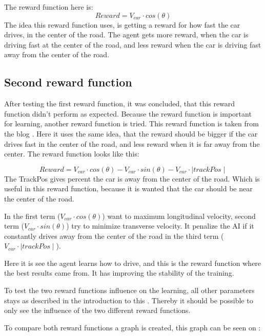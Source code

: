 The reward function here is:
\begin{equation}
Reward = V_{car} \cdot cos(\theta) 
\end{equation}
The idea this reward function uses, is getting a reward for how fast the car drives, in the center of the road. The agent gets more reward, when the car is driving fast at the center of the road, and less reward when the car is driving fast away from the center of the road. 

\subsection*{Second reward function}
After testing the first reward function, it was concluded, that this reward function didn't perform as expected. Because the reward function is important for learning, another reward function is tried. This reward function is taken from the blog \cite{DDPG_Torcs}. Here it uses the same idea, that the reward should be bigger if the car drives fast in the center of the road, and less reward when it is far away from the center. The reward function looks like this:

\begin{equation}
\label{eq:reward_2}
Reward = V_{car} \cdot cos(\theta) - V_{car} \cdot sin(\theta) - V_{car} \cdot \mid trackPos\mid 
\end{equation}
The TrackPos gives percent the car is away from the center of the road. Which is useful in this reward function, because it is wanted that the car should be near the center of the road.  

In  the first term ($V_{car} \cdot cos(\theta)$) want to maximum longitudinal velocity, second term ($V_{car} \cdot sin(\theta)$) try to minimize transverse velocity. It penalize the AI if it constantly drives away from the center of the road in the third term ($V_{car} \cdot \mid trackPos\mid$).

Here it is see the agent learns how to drive, and this is the reward function where the best results came from. It has improving the stability of the training. 

To test the two reward functions influence on the learning, all other parameters stays as described in the introduction to this . Thereby it should be possible to only see the influence of the two different reward functions. 

To compare both reward functions a graph is created, this graph can be seen on :

